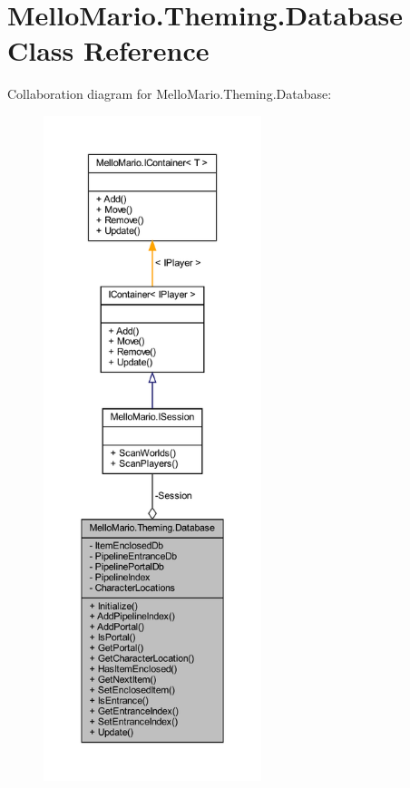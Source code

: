 \section{Mello\+Mario.\+Theming.\+Database Class Reference}
\label{classMelloMario_1_1Theming_1_1Database}


Collaboration diagram for Mello\+Mario.\+Theming.\+Database\+:
\nopagebreak
\begin{figure}[H]
\begin{center}
\leavevmode
\includegraphics[height=550pt]{classMelloMario_1_1Theming_1_1Database__coll__graph}
\end{center}
\end{figure}
